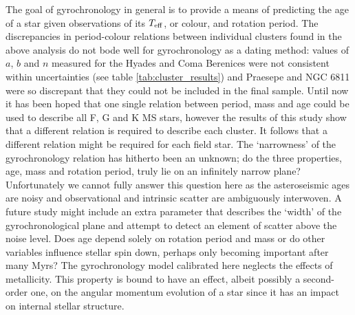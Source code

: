 \documentclass[11pt,preprint]{aastex}
\newcommand{\teff}{$T_{\rm{eff}}$}
\begin{document}

The goal of gyrochronology in general is to provide a means of predicting the
age of a star given observations of its \teff, or colour, and rotation period.
The discrepancies in period-colour relations between individual clusters found
in the above analysis do not bode well for gyrochronology as a dating method:
values of $a$, $b$ and $n$ measured for the Hyades and Coma Berenices were not
consistent within uncertainties (see table \ref{tab:cluster_results}) and
Praesepe and NGC 6811 were so discrepant that they could not be included in
the final sample.
Until now it has been hoped that one single relation between period, mass and
age could be used to describe all F, G and K MS stars, however the results of
this study show that a different relation is required to describe each
cluster.
It follows that a different relation might be required for each field star.
The `narrowness' of the gyrochronology relation has hitherto been an unknown;
do the three properties, age, mass and rotation period, truly lie on an
infinitely narrow plane?
Unfortunately we cannot fully answer this question here as the asteroseismic
ages are noisy and observational and intrinsic scatter are ambiguously
interwoven.
A future study might include an extra parameter that describes the `width' of
the gyrochronological plane and attempt to detect an element of scatter above
the noise level.
Does age depend solely on rotation period and mass or do other variables
influence stellar spin down, perhaps only becoming important after many Myrs?
The gyrochronology model calibrated here neglects the effects of metallicity.
This property is bound to have an effect, albeit possibly a second-order one,
on the angular momentum evolution of a star since it has an impact on internal
stellar structure.
\end{document}
